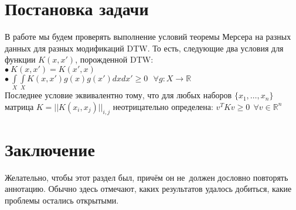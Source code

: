 \documentclass[12pt, twoside]{article}
\begin{document}
\section{Постановка задачи}
В работе мы будем проверять выполнение условий теоремы Мерсера на разных данных для разных модификаций DTW. То есть, следующие два условия для функции $K(x,x')$, порожденной DTW:\\
$\bullet \ K(x,x') = K(x',x)$\\
$\bullet \ \int\limits_X \int\limits_X K(x,x')g(x)g(x')dxdx' \geq 0 \ \ \ \forall g:X \rightarrow \mathbb{R}$\\
Последнее условие эквивалентно тому, что для любых наборов $\{ x_1, \ldots, x_n \}$ матрица $K = ||K(x_i,x_j)||_{i,j}$ неотрицательно определена: $v^TKv \geq 0 \ \ \forall v \in \mathbb{R}^n$





\section{Заключение}
Желательно, чтобы этот раздел был, причём он не~должен дословно повторять аннотацию.
Обычно здесь отмечают, каких результатов удалось добиться, какие проблемы остались открытыми.





\end{document}
